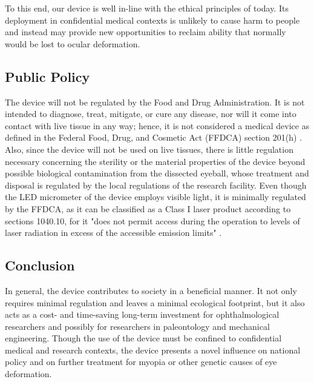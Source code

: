 \documentclass{article}
\begin{document}
To this end, our device is well in-line with the ethical principles of
today. Its deployment in confidential medical contexts is unlikely to cause harm to
people and instead may provide new opportunities to reclaim ability
that normally would be lost to ocular deformation.
 
 
\subsection{Public Policy}
\label{sec:Public Policy}
 
The device will not be regulated by the Food and Drug
Administration. It is not intended to diagnose, treat, mitigate, or
cure any disease, nor will it come into contact with live tissue in
any way; hence, it is not considered a medical device as defined in
the Federal Food, Drug, and Cosmetic Act (FFDCA) section 201(h)
\cite{fdaguidelines}. Also, since the device will not be used on live
tissues, there is little regulation necessary concerning the sterility
or the material properties of the device beyond possible biological
contamination from the dissected eyeball, whose treatment and disposal
is regulated by the local regulations of the research facility.  Even
though the LED micrometer of the device employs visible light, it is
minimally regulated by the FFDCA, as it can be classified as a Class I
laser product according to sections 1040.10, for it "does not permit
access during the operation to levels of laser radiation in excess of
the accessible emission limits" \cite{fdaguidelines}. 
 
 
\subsection{Conclusion}
\label{sec:Conclusion}

In general, the device contributes to society in a beneficial manner. It not only requires minimal regulation and leaves a minimal ecological footprint, 
but it also acts as a cost- and time-saving long-term investment
for ophthalmological researchers and possibly for researchers in paleontology and mechanical engineering. 
Though the use of the device must be confined to confidential medical and research contexts, the device presents
a novel influence on national policy and on further treatment for myopia or other genetic causes of eye deformation. 
 
\newpage
{}


 
\end{document}
